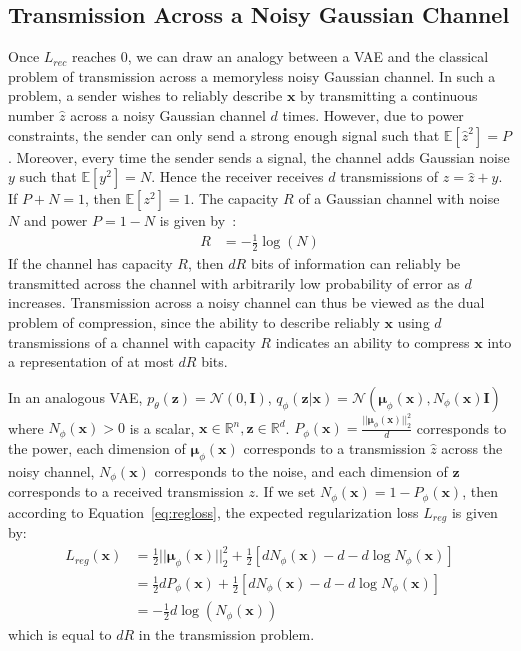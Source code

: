 \documentclass{article}
\begin{document}
 \subsection{Transmission Across a Noisy Gaussian Channel}
\label{sec:transmission}
 
Once $L_{rec}$ reaches $0$, we can draw an analogy between a VAE and the classical problem of transmission across a memoryless noisy Gaussian channel.
In such a problem, a sender wishes to reliably  describe $\mathbf{x}$ by transmitting a continuous number $\hat{z}$ across a noisy Gaussian channel $d$ times. 
However, due to power constraints, the sender can only send a strong enough signal such that $\mathbb{E} [\hat{z}^2] = P$.
Moreover, every time the sender sends a signal, the channel adds Gaussian noise $y$ such that $\mathbb{E} [y^2] = N$.
Hence the receiver receives $d$ transmissions of $z = \hat{z} + y$. If $P+N=1$, then $\mathbb{E} [z^2] = 1$.
The capacity $R$ of a Gaussian channel with noise $N$ and power $P=1-N$ is given by~\cite{cover2012elements}:
\begin{align}
    R &=-\frac{1}{2}\log(N)
\end{align}
If the channel has capacity $R$, then $dR$ bits of information can reliably be transmitted across the channel with arbitrarily low probability of error as $d$ increases.  Transmission across a noisy channel can thus be viewed as the dual problem of compression, since the ability to describe reliably $\mathbf{x}$ using $d$ transmissions of a channel with capacity $R$ indicates an ability to compress $\mathbf{x}$ into a representation of at most $dR$ bits.

In an analogous VAE, $p_\theta(\mathbf{z}) = \mathcal{N}(0,\mathbf{I})$, $q_\phi(\mathbf{z}|\mathbf{x}) = \mathcal{N}(\boldsymbol \mu_\phi(\mathbf{x}), N_\phi(\mathbf{x}) \mathbf{I})$ where $N_\phi(\mathbf{x})>0$ is a scalar, $\mathbf{x} \in \mathbb{R}^n, \mathbf{z} \in \mathbb{R}^d$.
 $P_\phi(\mathbf{x})= \frac{||\boldsymbol \mu_\phi(\mathbf{x})||_2^2}{d} $ corresponds to the power, each dimension of $\boldsymbol \mu_\phi(\mathbf{x})$ corresponds to a transmission $\hat{z}$ across the noisy channel, $N_\phi(\mathbf{x})$ corresponds to the noise, and each dimension of $\mathbf{z}$ corresponds to a received transmission $z$. If we set $N_\phi(\mathbf{x})=1-P_\phi(\mathbf{x})$, then according to Equation~\ref{eq:regloss}, the expected regularization loss $L_{reg}$ is given by:
\begin{align}
    L_{reg}(\mathbf{x}) & = 
    \frac{1}{2} ||\boldsymbol \mu_\phi(\mathbf{x})||_2^2 + \frac{1}{2} [ d N_\phi(\mathbf{x}) - d - d \log N_\phi(\mathbf{x})]\\
    & =  \frac{1}{2} dP_\phi(\mathbf{x}) + \frac{1}{2} [ dN_\phi(\mathbf{x})  - d - d \log N_\phi(\mathbf{x})] \\
    & =-\frac{1}{2}d\log(N_\phi(\mathbf{x}))
\end{align}
which is equal to $dR$ in the transmission problem. 
\end{document}
